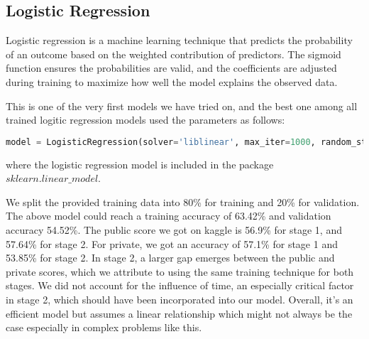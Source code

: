\subsection*{Logistic Regression}

Logistic regression is a machine learning technique that predicts the probability of an outcome based on the weighted contribution of predictors. The sigmoid function ensures the probabilities are valid, and the coefficients are adjusted during training to maximize how well the model explains the observed data. 

This is one of the very first models we have tried on, and the best one among all trained logitic regression models used the parameters as follows: 

\begin{lstlisting}[language=Python]
model = LogisticRegression(solver='liblinear', max_iter=1000, random_state=42)
\end{lstlisting}

where the logistic regression model is included in the package $sklearn.linear\_model$.

We split the provided training data into 80\% for training and 20\% for validation. The above model could reach a training accuracy of 63.42\% and validation accuracy 54.52\%. The public score we got on kaggle is 56.9\% for stage 1, and 57.64\% for stage 2. For private, we got an accuracy of 57.1\% for stage 1 and 53.85\% for stage 2. In stage 2, a larger gap emerges between the public and private scores, which we attribute to using the same training technique for both stages. We did not account for the influence of time, an especially critical factor in stage 2, which should have been incorporated into our model. Overall, it's an efficient model but assumes a linear relationship which might not always be the case especially in complex problems like this.
